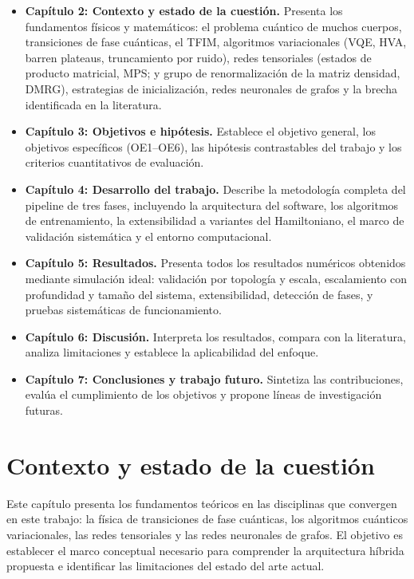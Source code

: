 \documentclass[11pt,a4paper,spanish]{book}
\begin{document}
\begin{itemize}
    \item \textbf{Capítulo 2: Contexto y estado de la cuestión.} Presenta los fundamentos físicos y matemáticos: el problema cuántico de muchos cuerpos, transiciones de fase cuánticas, el TFIM, algoritmos variacionales (VQE, HVA, barren plateaus, truncamiento por ruido), redes tensoriales (estados de producto matricial, MPS; y grupo de renormalización de la matriz densidad, DMRG), estrategias de inicialización, redes neuronales de grafos y la brecha identificada en la literatura.

    \item \textbf{Capítulo 3: Objetivos e hipótesis.} Establece el objetivo general, los objetivos específicos (OE1--OE6), las hipótesis contrastables del trabajo y los criterios cuantitativos de evaluación.

    \item \textbf{Capítulo 4: Desarrollo del trabajo.} Describe la metodología completa del pipeline de tres fases, incluyendo la arquitectura del software, los algoritmos de entrenamiento, la extensibilidad a variantes del Hamiltoniano, el marco de validación sistemática y el entorno computacional.

    \item \textbf{Capítulo 5: Resultados.} Presenta todos los resultados numéricos obtenidos mediante simulación ideal: validación por topología y escala, escalamiento con profundidad y tamaño del sistema, extensibilidad, detección de fases, y pruebas sistemáticas de funcionamiento.

    \item \textbf{Capítulo 6: Discusión.} Interpreta los resultados, compara con la literatura, analiza limitaciones y establece la aplicabilidad del enfoque.

    \item \textbf{Capítulo 7: Conclusiones y trabajo futuro.} Sintetiza las contribuciones, evalúa el cumplimiento de los objetivos y propone líneas de investigación futuras.
\end{itemize}



\chapter{Contexto y estado de la cuestión}

Este capítulo presenta los fundamentos teóricos en las disciplinas que convergen en este trabajo: la física de transiciones de fase cuánticas, los algoritmos cuánticos variacionales, las redes tensoriales y las redes neuronales de grafos. El objetivo es establecer el marco conceptual necesario para comprender la arquitectura híbrida propuesta e identificar las limitaciones del estado del arte actual.
\end{document}
